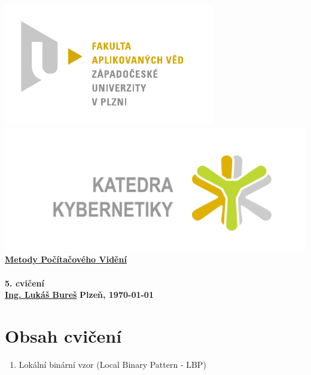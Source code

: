 \documentclass[12pt, a4paper]{article}
\newcommand{\cisloCviceni}{5. cvičení}
\begin{document}
 









 
\begin{titlepage}
\begin{center}
	\includegraphics[trim = 0.6cm 0.5cm 0.9cm 0.5cm, scale=1]{./FAV_logo_cz.pdf}
	\hspace*{\fill}
	\includegraphics[trim = 3.5cm 1.5cm 2.6cm 2cm, scale=0.295]{./KKY_logo_cz.pdf}\\
	\vspace*{\fill}
	\textbf{\Huge{\href{http://www.kky.zcu.cz/cs/courses/mpv}{Metody Počítačového Vidění} \\ ~ \\ \cisloCviceni}}\\
	\vspace*{\fill}
	\textbf{\large{\href{mailto:LBures@kky.zcu.cz}{Ing. Lukáš Bureš}}} \hfill \textbf{\large{Plzeň, \today}}
\end{center}
\end{titlepage}












\section*{Obsah cvičení}
\begin{enumerate}
	\item Lokální binární vzor (Local Binary Pattern - LBP)
\end{enumerate}
\end{document}
